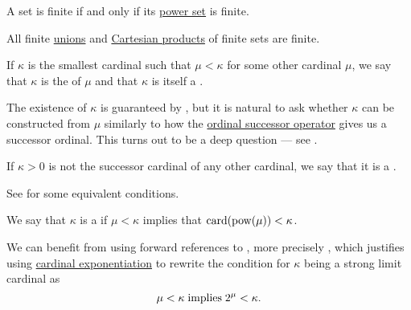 \begin{proposition}\label{thm:power_set_finiteness}
  A set is finite if and only if its \hyperref[def:basic_set_operations/power_set]{power set} is finite.
\end{proposition}

\begin{proposition}\label{thm:finite_unions_and_products_are_finite}
  All finite \hyperref[def:basic_set_operations/union]{unions} and \hyperref[def:cartesian_product]{Cartesian products} of finite sets are finite.
\end{proposition}

\begin{definition}\label{def:successor_and_limit_cardinal}
  \begin{thmenum}
     If \( \kappa \) is the smallest cardinal such that \( \mu < \kappa \) for some other cardinal \( \mu \), we say that \( \kappa \) is the  of \( \mu \) and that \( \kappa \) is itself a .

    The existence of \( \kappa \) is guaranteed by , but it is natural to ask whether \( \kappa \) can be constructed from \( \mu \) similarly to how the \hyperref[def:ordinal_successor]{ordinal successor operator} gives us a successor ordinal. This turns out to be a deep question --- see .

     If \( \kappa > 0 \) is not the successor cardinal of any other cardinal, we say that it is a .

    See  for some equivalent conditions.

     We say that \( \kappa \) is a  if \( \mu < \kappa \) implies that \( \operatorname{card}(\operatorname{pow}(\mu)) < \kappa \).

    We can benefit from using forward references to , more precisely , which justifies using \hyperref[def:cardinal_arithmetic/exponentiation]{cardinal exponentiation} to rewrite the condition for \( \kappa \) being a strong limit cardinal as
    \begin{equation*}
      \mu < \kappa \T{implies} 2^\mu < \kappa.
    \end{equation*}


\end{thmenum}
\end{definition}
